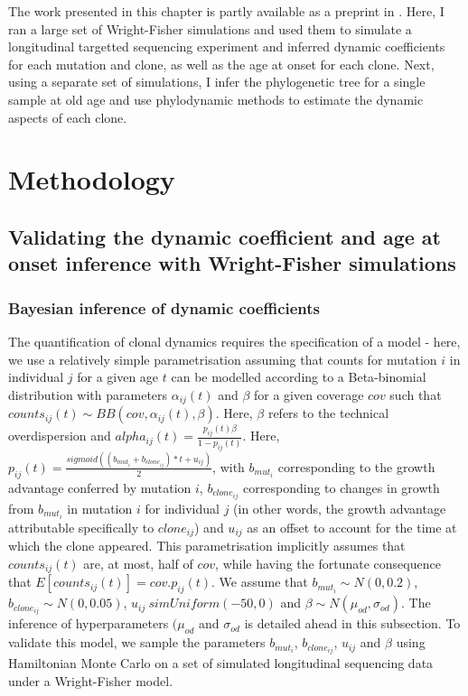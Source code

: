 The work presented in this chapter is partly available as a preprint in \cite{Fabre2021-uw}. Here, I ran a large set of Wright-Fisher simulations and used them to simulate a longitudinal targetted sequencing experiment and inferred dynamic coefficients for each mutation and clone, as well as the age at onset for each clone. Next, using a separate set of simulations, I infer the phylogenetic tree for a single sample at old age and use phylodynamic methods to estimate the dynamic aspects of each clone.

\section{Methodology}

\subsection{Validating the dynamic coefficient and age at onset inference with Wright-Fisher simulations}

\subsubsection{Bayesian inference of dynamic coefficients}

The quantification of clonal dynamics requires the specification of a model - here, we use a relatively simple parametrisation assuming that counts for mutation $i$ in individual $j$ for a given age $t$ can be modelled according to a Beta-binomial distribution with parameters $\alpha_{ij}(t)$ and $\beta$ for a given coverage $cov$ such that $counts_{ij}(t) \sim BB(cov,\alpha_{ij}(t),\beta)$. Here, $\beta$ refers to the technical overdispersion and $alpha_{ij}(t) = \frac{p_{ij}(t)\beta}{1-p_{ij}(t)}$. Here, $p_{ij}(t) = \frac{sigmoid((b_{mut_i} + b_{clone_{ij}}) * t + u_{ij})}{2}$, with $b_{mut_i}$ corresponding to the growth advantage conferred by mutation $i$, $b_{clone_{ij}}$ corresponding to changes in growth from $b_{mut_i}$ in mutation $i$ for individual $j$ (in other words, the growth advantage attributable specifically to $clone_{ij}$) and $u_{ij}$ as an offset to account for the time at which the clone appeared. This parametrisation implicitly assumes that $counts_{ij}(t)$ are, at most, half of $cov$, while having the fortunate consequence that $E[counts_{ij}(t)] = cov.p_{ij}(t)$. We assume that $b_{mut_i} \sim N(0,0.2)$, $b_{clone_{ij}} \sim N(0,0.05)$, $u_{ij} \ sim Uniform(-50,0)$ and $\beta \sim N(\mu_{od},\sigma_{od})$. The inference of hyperparameters $(\mu_{od}$ and $\sigma_{od}$ is detailed ahead in this subsection. To validate this model, we sample the parameters $b_{mut_i}$, $b_{clone_{ij}}$, $u_{ij}$ and $\beta$ using Hamiltonian Monte Carlo on a set of simulated longitudinal sequencing data under a Wright-Fisher model. 

